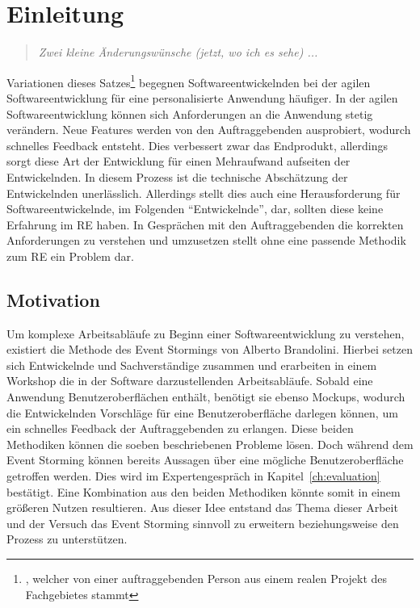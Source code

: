\chapter{Einleitung}\label{ch:einleitung}

\begin{quote}
    \textit{Zwei kleine Änderungswünsche (jetzt, wo ich es sehe) ...}
\end{quote}


Variationen dieses Satzes\footnote{, welcher von einer auftraggebenden Person aus einem realen Projekt des Fachgebietes stammt}
begegnen Softwareentwickelnden bei der agilen Softwareentwicklung für eine personalisierte Anwendung häufiger.
In der agilen Softwareentwicklung können sich Anforderungen an die Anwendung stetig verändern.
Neue Features werden von den Auftraggebenden ausprobiert, wodurch schnelles Feedback entsteht.
Dies verbessert zwar das Endprodukt, allerdings sorgt diese Art der Entwicklung für einen Mehraufwand aufseiten der Entwickelnden.
In diesem Prozess ist die technische Abschätzung der Entwickelnden unerlässlich.
Allerdings stellt dies auch eine Herausforderung für Softwareentwickelnde, im Folgenden ``Entwickelnde'', dar, sollten diese keine Erfahrung im
\ac{RE} haben.
In Gesprächen mit den Auftraggebenden die korrekten Anforderungen zu verstehen und umzusetzen stellt ohne eine passende Methodik zum
\ac{RE} ein Problem dar.

\section{Motivation}\label{sec:motivation}
Um komplexe Arbeitsabläufe zu Beginn einer Softwareentwicklung zu verstehen, existiert die Methode des Event Stormings von Alberto Brandolini.
Hierbei setzen sich Entwickelnde und Sachverständige zusammen und erarbeiten in einem Workshop die in der Software darzustellenden Arbeitsabläufe.
Sobald eine Anwendung Benutzeroberflächen enthält, benötigt sie ebenso Mockups, wodurch die Entwickelnden Vorschläge für eine Benutzeroberfläche
darlegen können, um ein schnelles Feedback der Auftraggebenden zu erlangen.
Diese beiden Methodiken können die soeben beschriebenen Probleme lösen.
Doch während dem Event Storming können bereits Aussagen über eine mögliche Benutzeroberfläche getroffen werden.
Dies wird im Expertengespräch in Kapitel~\ref{ch:evaluation} bestätigt.
Eine Kombination aus den beiden Methodiken könnte somit in einem größeren Nutzen resultieren.
Aus dieser Idee entstand das Thema dieser Arbeit und der Versuch das Event Storming sinnvoll zu erweitern beziehungsweise den Prozess zu unterstützen.

